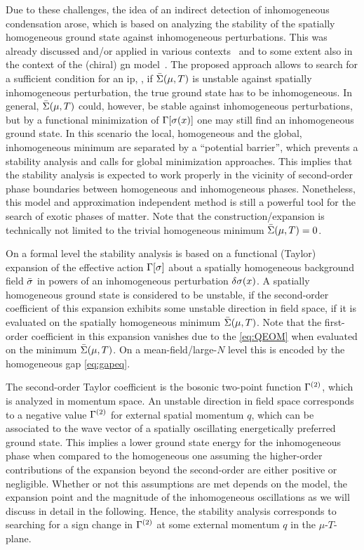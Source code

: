 Due to these challenges, the idea of an indirect detection of inhomogeneous condensation arose, which is based on analyzing the stability of the spatially homogeneous ground state against inhomogeneous perturbations.
This was already discussed and/or applied in various contexts~\cite{Fu:2019hdw,Winstel:2021yok,Buballa:2020nsi,Winstel:2019zfn,Buballa:2018hux} and to some extent also in the context of the (chiral) \gls{gn} model~\cite{Thies:2003kk,Thies:2019ejd}.
The proposed approach allows to search for a sufficient condition for an \gls{ip}, \ie{}, if $\bar{\Sigma} ( \mu, T )$ is unstable against spatially inhomogeneous perturbation, the true ground state has to be inhomogeneous.
In general, $\bar{\Sigma} ( \mu, T )$ could, however, be stable against inhomogeneous perturbations, but by a functional minimization of $\Gamma [\sigma ( x ) ]$ one may still find an inhomogeneous ground state.
In this scenario the local, homogeneous and the global, inhomogeneous minimum are separated by a ``potential barrier'', which prevents a stability analysis and calls for global minimization approaches.
This implies that the stability analysis is expected to work properly in the vicinity of second-order phase boundaries between homogeneous and inhomogeneous phases.
Nonetheless, this model and approximation independent method is still a powerful tool for the search of exotic phases of matter.
Note that the construction/expansion is technically not limited to the trivial homogeneous minimum $\bar{\Sigma} ( \mu, T )=0$. \bigskip

On a formal level the stability analysis is based on a functional (Taylor) expansion of the effective action ${\Gamma [ \sigma ]}$ about a spatially homogeneous background field $\bar{\sigma}$ in powers of an inhomogeneous perturbation $\delta \sigma(x)$.
A spatially homogeneous ground state is considered to be unstable, if the second-order coefficient of this expansion exhibits some unstable direction in field space, if it is evaluated on the spatially homogeneous minimum $\bar{\Sigma} ( \mu, T )$.
Note that the first-order coefficient in this expansion vanishes due to the \qeom{} \cref{eq:QEOM} when evaluated on the \ir{} minimum $\bar{\Sigma} ( \mu, T )$.
On a mean-field/large-$N$ level this is encoded by the homogeneous gap \cref{eq:gapeq}.

The second-order Taylor coefficient is the bosonic two-point function $\Gamma^{(2)}$, which is analyzed in momentum space.
An unstable direction in field space corresponds to a negative value $\Gamma^{(2)}$ for external spatial momentum $q$, which can be associated to the wave vector of a spatially oscillating energetically preferred ground state.
This implies a lower ground state energy for the inhomogeneous phase when compared to the homogeneous one assuming the higher-order contributions of the expansion beyond the second-order are either positive or negligible.
Whether or not this assumptions are met depends on the model, the expansion point and the magnitude of the inhomogeneous oscillations as we will discuss in detail in the following.
Hence, the stability analysis corresponds to searching for a sign change in $\Gamma^{(2)}$ at some external momentum $q$ in the $\mu$-$T$-plane.

